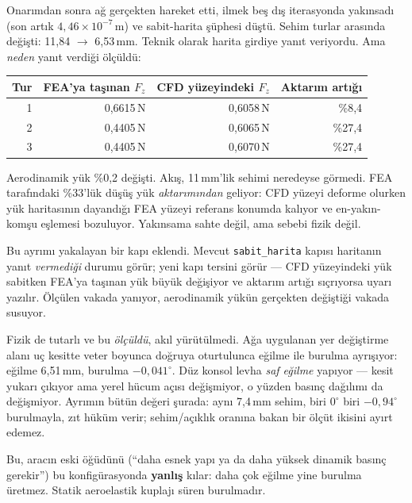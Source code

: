 \documentclass[11pt,a4paper]{article}
\begin{document}
\noindent Onarımdan sonra ağ gerçekten hareket etti, ilmek beş dış iterasyonda
yakınsadı (son artık $4{,}46\times10^{-7}$\,m) ve sabit-harita şüphesi düştü.
Sehim turlar arasında değişti: 11{,}84 $\rightarrow$ 6{,}53\,mm. Teknik olarak
harita girdiye yanıt veriyordu. Ama \emph{neden} yanıt verdiği ölçüldü:

\begin{center}\footnotesize
\begin{tabular}{@{}rrrr@{}}
\toprule
Tur & FEA'ya taşınan $F_z$ & CFD yüzeyindeki $F_z$ & Aktarım artığı \\
\midrule
1 & 0{,}6615\,N & 0{,}6058\,N & \%8{,}4 \\
2 & 0{,}4405\,N & 0{,}6065\,N & \%27{,}4 \\
3 & 0{,}4405\,N & 0{,}6070\,N & \%27{,}4 \\
\bottomrule
\end{tabular}
\end{center}

\noindent Aerodinamik yük \%0{,}2 değişti. Akış, 11\,mm'lik sehimi neredeyse
görmedi. FEA tarafındaki \%33'lük düşüş yük \emph{aktarımından} geliyor: CFD
yüzeyi deforme olurken yük haritasının dayandığı FEA yüzeyi referans konumda
kalıyor ve en-yakın-komşu eşlemesi bozuluyor. Yakınsama sahte değil, ama
sebebi fizik değil.

Bu ayrımı yakalayan bir kapı eklendi. Mevcut \texttt{sabit\_harita} kapısı
haritanın yanıt \emph{vermediği} durumu görür; yeni kapı tersini görür ---
CFD yüzeyindeki yük sabitken FEA'ya taşınan yük büyük değişiyor ve aktarım
artığı sıçrıyorsa uyarı yazılır. Ölçülen vakada yanıyor, aerodinamik yükün
gerçekten değiştiği vakada susuyor.

Fizik de tutarlı ve bu \emph{ölçüldü}, akıl yürütülmedi. Ağa uygulanan yer
değiştirme alanı uç kesitte veter boyunca doğruya oturtulunca eğilme ile
burulma ayrışıyor: eğilme 6{,}51\,mm, burulma $-0{,}041^\circ$. Düz konsol
levha \emph{saf eğilme} yapıyor --- kesit yukarı çıkıyor ama yerel hücum açısı
değişmiyor, o yüzden basınç dağılımı da değişmiyor. Ayrımın bütün değeri
şurada: aynı 7{,}4\,mm sehim, biri $0^\circ$ biri $-0{,}94^\circ$ burulmayla,
zıt hüküm verir; sehim/açıklık oranına bakan bir ölçüt ikisini ayırt edemez.

Bu, aracın eski öğüdünü (``daha esnek yapı ya da daha yüksek dinamik basınç
gerekir'') bu konfigürasyonda \textbf{yanlış} kılar: daha çok eğilme yine
burulma üretmez. Statik aeroelastik kuplajı süren burulmadır.
\end{document}
